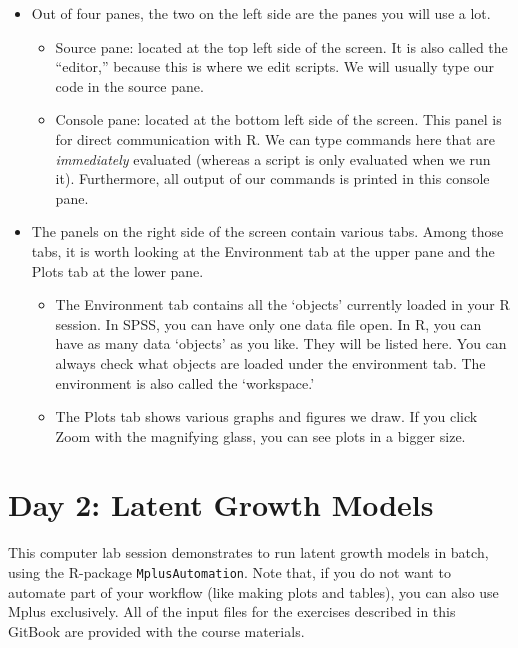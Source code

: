\documentclass[
]{book}
\providecommand{\tightlist}{%
  \setlength{\itemsep}{0pt}\setlength{\parskip}{0pt}}
\begin{document}
\begin{itemize}
\tightlist
\item
  Out of four panes, the two on the left side are the panes you will use a lot.

  \begin{itemize}
  \tightlist
  \item
    Source pane: located at the top left side of the screen. It is also called the ``editor,'' because this is where we edit scripts. We will usually type our code in the source pane.
  \item
    Console pane: located at the bottom left side of the screen. This panel is for direct communication with R. We can type commands here that are \emph{immediately} evaluated (whereas a script is only evaluated when we run it). Furthermore, all output of our commands is printed in this console pane.
  \end{itemize}
\item
  The panels on the right side of the screen contain various tabs. Among those tabs, it is worth looking at the Environment tab at the upper pane and the Plots tab at the lower pane.

  \begin{itemize}
  \tightlist
  \item
    The Environment tab contains all the `objects' currently loaded in your R session. In SPSS, you can have only one data file open. In R, you can have as many data `objects' as you like. They will be listed here. You can always check what objects are loaded under the environment tab. The environment is also called the `workspace.'
  \item
    The Plots tab shows various graphs and figures we draw. If you click Zoom with the magnifying glass, you can see plots in a bigger size.
  \end{itemize}
\end{itemize}

\hypertarget{day-2-latent-growth-models}{%
\chapter{Day 2: Latent Growth Models}\label{day-2-latent-growth-models}}

This computer lab session demonstrates to run latent growth models in batch, using the R-package \texttt{MplusAutomation}.
Note that, if you do not want to automate part of your workflow (like making plots and tables), you can also use Mplus exclusively.
All of the input files for the exercises described in this GitBook are provided with the course materials.
\end{document}
